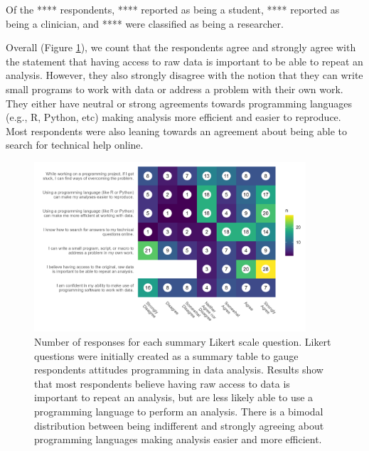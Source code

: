 \documentclass[020-persona\_validation.tex]{subfiles}
\begin{document}
        Of the **** respondents,
        **** reported as being a student,
        **** reported as being a clinician, and
        **** were classified as being a researcher.

        Overall (Figure \ref{fig:likert}),
        we count that the respondents agree and strongly agree with the statement
        that having access to raw data is important to be able to repeat an analysis.
        However, they also strongly disagree with the notion that
        they can write small programs to work with data or address a problem with their own work. %
        They either have neutral or strong agreements towards programming languages (e.g., R, Python, etc)
        making analysis more efficient and easier to reproduce.
        Most respondents were also leaning towards an agreement about being able to search for technical help online.

        \begin{figure}[htb]
            \centering
            \includegraphics[width=0.9\textwidth]{figs/020-persona/likert.png}
            \caption[Summary Likert scale responses]
            {Number of responses for each summary Likert scale question.
             Likert questions were initially created as a summary table to gauge respondents attitudes programming
             in data analysis.
             Results show that most respondents believe having raw access to data is important to repeat an analysis,
             but are less likely able to use a programming language to perform an analysis.
             There is a bimodal distribution between being indifferent and strongly agreeing
             about programming languages making analysis easier and more efficient.
            }
            \label{fig:likert}
        \end{figure}
\end{document}
